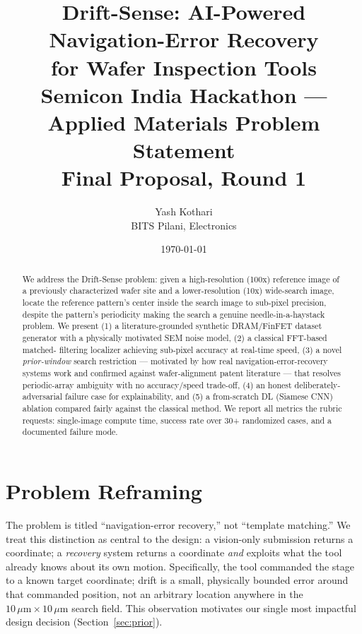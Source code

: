 \documentclass[11pt]{article}
\title{\textbf{Drift-Sense: AI-Powered Navigation-Error Recovery\\ for Wafer Inspection Tools}\\
\large Semicon India Hackathon --- Applied Materials Problem Statement\\
\large Final Proposal, Round 1}
\author{Yash Kothari \\ BITS Pilani, Electronics}
\date{\today}
\begin{document}
\maketitle

\begin{abstract}
We address the Drift-Sense problem: given a high-resolution (100x) reference
image of a previously characterized wafer site and a lower-resolution (10x)
wide-search image, locate the reference pattern's center inside the search
image to sub-pixel precision, despite the pattern's periodicity making the
search a genuine needle-in-a-haystack problem. We present (1) a
literature-grounded synthetic DRAM/FinFET dataset generator with a
physically motivated SEM noise model, (2) a classical FFT-based matched-
filtering localizer achieving sub-pixel accuracy at real-time speed, (3) a
novel \emph{prior-window} search restriction --- motivated by how real
navigation-error-recovery systems work and confirmed against wafer-alignment
patent literature --- that resolves periodic-array ambiguity with no
accuracy/speed trade-off, (4) an honest deliberately-adversarial failure
case for explainability, and (5) a from-scratch DL (Siamese CNN) ablation
compared fairly against the classical method. We report all metrics the
rubric requests: single-image compute time, success rate over 30+
randomized cases, and a documented failure mode.
\end{abstract}

\tableofcontents
\newpage

\section{Problem Reframing}

The problem is titled ``navigation-error recovery,'' not ``template
matching.'' We treat this distinction as central to the design: a
vision-only submission returns a coordinate; a \emph{recovery} system
returns a coordinate \emph{and} exploits what the tool already knows about
its own motion. Specifically, the tool commanded the stage to a known
target coordinate; drift is a small, physically bounded error around that
commanded position, not an arbitrary location anywhere in the $10\,\mu
\text{m} \times 10\,\mu\text{m}$ search field. This observation motivates
our single most impactful design decision (Section~\ref{sec:prior}).

\end{document}
